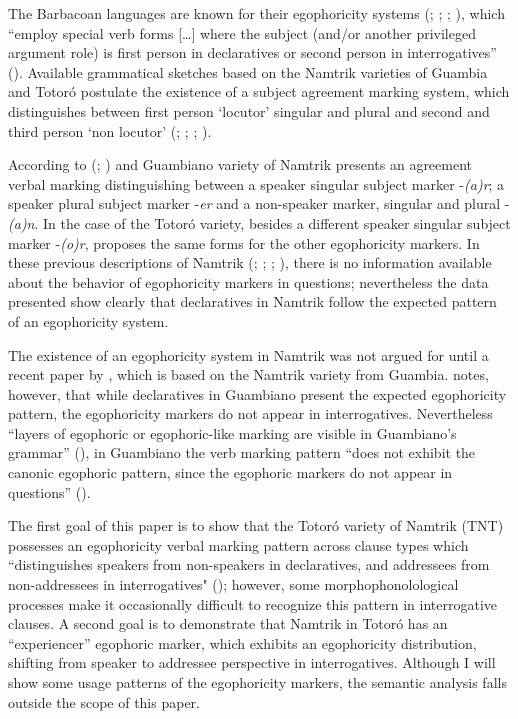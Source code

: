 \documentclass[output=paper]{langsci/langscibook}
\begin{document}
The Barbacoan languages are known for their egophoricity systems (\citealt{Dickinson2000}; \citealt{Curnow2002a}; \citealt{CurnowLiddicoat1998}; \citealt{Floyd2018}), which “employ special verb forms […] where the subject (and/or another privileged argument role) is first person in declaratives or second person in interrogatives” (\citealt{SanRoque2018}). Available grammatical sketches based on the Namtrik varieties of Guambia and Totoró postulate the existence of a subject agreement marking system, which distinguishes between first person ‘locutor’ singular and plural and second and third person ‘non locutor’ (\citealt{Pabon1989}; \citealt{TrivinoGarzon1989}; \citealt{Vasquez1987}; \citealt{Vasquez1988}). 


According to \citeauthor{Vasquez1987} (\citealt{Vasquez1987}; \citealt{Vasquez1988}) and \citet{TrivinoGarzon1989} Guambiano variety of Namtrik presents an agreement verbal marking distinguishing between a speaker singular subject marker -\textit{(a)r}; a speaker plural subject marker -\textit{er} and a non-speaker marker, singular and plural -\textit{(a)n}. In the case of the Totoró variety, besides a different speaker singular subject marker -\textit{(o)r}, \citet{Pabon1989} proposes the same forms for the other egophoricity markers. In these previous descriptions of Namtrik (\citealt{Pabon1989}; \citealt{TrivinoGarzon1989}; \citealt{Vasquez1987}; \citealt{Vasquez1988}), there is no information available about the behavior of egophoricity markers in questions; nevertheless the data presented show clearly that declaratives in Namtrik follow the expected pattern of an egophoricity system.

The existence of an egophoricity system in Namtrik was not argued for until a recent paper by \citet{Norcliffe2018}, which is based on the Namtrik variety from Guambia. \citet{Norcliffe2018} notes, however, that while declaratives in Guambiano present the expected egophoricity pattern, the egophoricity markers do not appear in interrogatives. Nevertheless “layers of egophoric or egophoric-like marking are visible in Guambiano’s grammar” (\citealt{Norcliffe2018}), in Guambiano the verb marking pattern “does not exhibit the canonic egophoric pattern, since the egophoric markers do not appear in questions” (\citealt{Norcliffe2018}).

The first goal of this paper is to show that the Totoró variety of Namtrik (TNT) possesses an egophoricity verbal marking pattern across clause types which “distinguishes speakers from non-speakers in declaratives, and addressees from non-addressees in interrogatives" (\citealt[1]{Creissels2008}); however, some morphophonolological processes make it occasionally difficult to recognize this pattern in interrogative clauses. A second goal is to demonstrate that Namtrik in Totoró has an “experiencer” egophoric marker, which exhibits an egophoricity distribution, shifting from speaker to addressee perspective in interrogatives. Although I will show some usage patterns of the egophoricity markers, the semantic analysis falls outside the scope of this paper.
\end{document}
